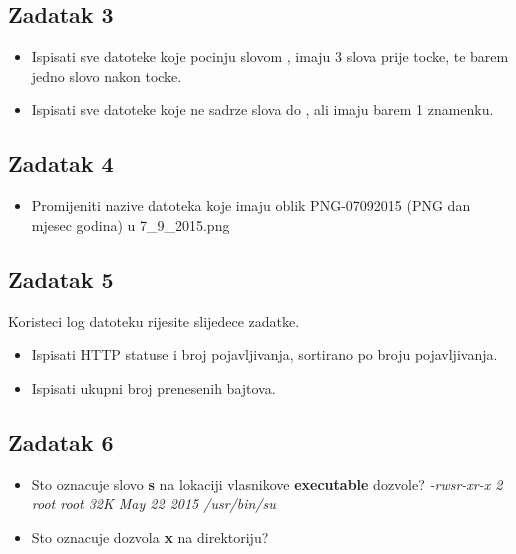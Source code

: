 \documentclass[12pt,a4paper]{article}
\begin{document}
	\subsection*{Zadatak 3}
	\begin{itemize}
    \item Ispisati sve datoteke koje pocinju slovom , imaju 3 slova prije tocke, te barem jedno slovo nakon tocke. 
    \item Ispisati sve datoteke koje ne sadrze slova  do , ali imaju barem 1 znamenku.
	\end{itemize}
  
	\subsection*{Zadatak 4}
	\begin{itemize}
    \item Promijeniti nazive datoteka koje imaju oblik PNG-07092015 (PNG dan mjesec godina) u 7_9_2015.png
	\end{itemize}

	\subsection*{Zadatak 5}
  Koristeci log datoteku rijesite slijedece zadatke.
	\begin{itemize}
    \item Ispisati HTTP statuse i broj pojavljivanja, sortirano po broju pojavljivanja.
    \item Ispisati ukupni broj prenesenih bajtova.
	\end{itemize}

  \subsection*{Zadatak 6}
	\begin{itemize}
    \item Sto oznacuje slovo \textbf{s} na lokaciji vlasnikove \textbf{executable} dozvole? \textit{-rwsr-xr-x 2 root root 32K May 22  2015 /usr/bin/su}
    \item Sto oznacuje dozvola \textbf{x} na direktoriju?
	\end{itemize}
\end{document}
